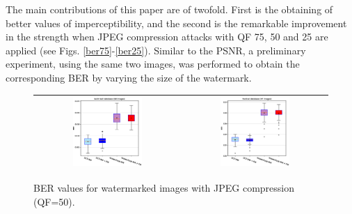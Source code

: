 \documentclass[runningheads]{llncs}
\begin{document}
The main contributions of this paper are of twofold. First is the obtaining of better values of imperceptibility, and the second is the remarkable improvement in the strength when JPEG compression attacks with QF 75, 50 and 25 are applied (see Figs. \ref{ber75}-\ref{ber25}). Similar to the PSNR, a preliminary experiment, using the same two images, was performed to obtain the corresponding BER by varying the size of the watermark.
\begin{figure}[H]
	\begin{center}
		\begin{tabular}{|c|c|}\hline
			\includegraphics[width=0.5\textwidth]{BER50SaintGall.eps}
			&\includegraphics[width=0.5\textwidth]{BER50Parzival.eps}\\\hline
		\end{tabular}
	\end{center}
	\caption{BER values for watermarked images with JPEG compression (QF=50).}
	\label{ber50}
\end{figure}
\end{document}
